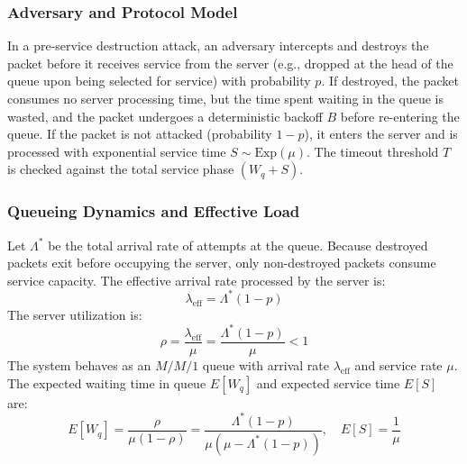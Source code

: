 \documentclass[12pt,onecolumn]{article}
\begin{document}
\subsubsection{Adversary and Protocol Model}
In a pre-service destruction attack, an adversary intercepts and destroys the packet before it receives service from the server (e.g., dropped at the head of the queue upon being selected for service) with probability $p$. If destroyed, the packet consumes no server processing time, but the time spent waiting in the queue is wasted, and the packet undergoes a deterministic backoff $B$ before re-entering the queue. If the packet is not attacked (probability $1 - p$), it enters the server and is processed with exponential service time $S \sim \text{Exp}(\mu)$. The timeout threshold $T$ is checked against the total service phase $(W_q + S)$.

\subsubsection{Queueing Dynamics and Effective Load}
Let $\Lambda^*$ be the total arrival rate of attempts at the queue. Because destroyed packets exit before occupying the server, only non-destroyed packets consume service capacity. The effective arrival rate processed by the server is:
\begin{equation}
\lambda_{\text{eff}} = \Lambda^*(1 - p)
\end{equation}
The server utilization is:
\begin{equation}
\rho = \frac{\lambda_{\text{eff}}}{\mu} = \frac{\Lambda^*(1 - p)}{\mu} < 1
\end{equation}
The system behaves as an $M/M/1$ queue with arrival rate $\lambda_{\text{eff}}$ and service rate $\mu$. The expected waiting time in queue $E[W_q]$ and expected service time $E[S]$ are:
\begin{equation}
E[W_q] = \frac{\rho}{\mu(1 - \rho)} = \frac{\Lambda^*(1 - p)}{\mu(\mu - \Lambda^*(1 - p))}, \quad E[S] = \frac{1}{\mu}
\end{equation}
\end{document}
